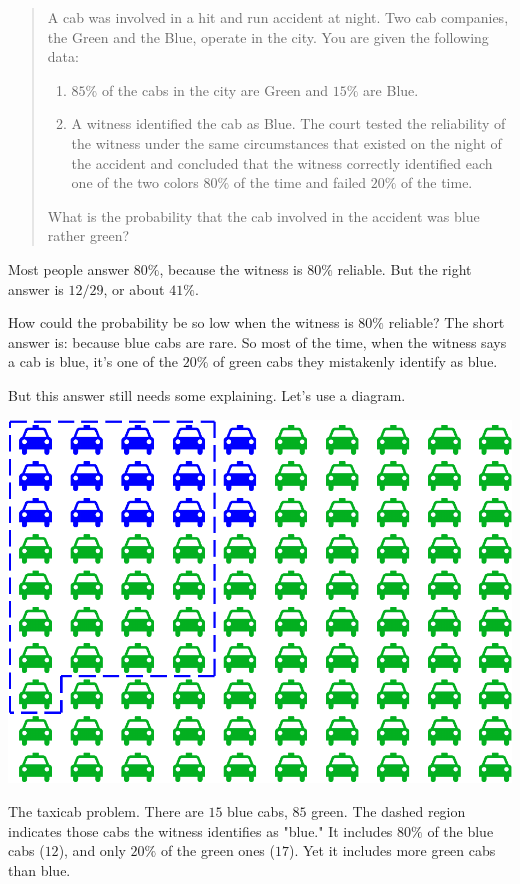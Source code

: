\documentclass[justified]{tufte-book}
\providecommand{\tightlist}{%
  \setlength{\itemsep}{0pt}\setlength{\parskip}{0pt}}
\newenvironment{problem}{\begin{quote}\normalsize}{\end{quote}}
\theoremstyle{definition}
\theoremstyle{definition}
\theoremstyle{definition}
\theoremstyle{definition}
\theoremstyle{remark}
\begin{document}
\begin{problem}
A cab was involved in a hit and run accident at night. Two cab
companies, the Green and the Blue, operate in the city. You are given
the following data:

\begin{enumerate}
\def\labelenumi{\arabic{enumi}.}
\tightlist
\item
  \(85\%\) of the cabs in the city are Green and \(15\%\) are Blue.
\item
  A witness identified the cab as Blue. The court tested the reliability
  of the witness under the same circumstances that existed on the night
  of the accident and concluded that the witness correctly identified
  each one of the two colors \(80\%\) of the time and failed \(20\%\) of
  the time.
\end{enumerate}

What is the probability that the cab involved in the accident was blue
rather green?
\end{problem}

Most people answer \(80\%\), because the witness is \(80\%\) reliable. But the right answer is \(12/29\), or about \(41\%\).

How could the probability be so low when the witness is \(80\%\) reliable? The short answer is: because blue cabs are rare. So most of the time, when the witness says a cab is blue, it's one of the \(20\%\) of green cabs they mistakenly identify as blue.

But this answer still needs some explaining. Let's use a diagram.

\begin{marginfigure}
\includegraphics{_main_files/figure-latex/taxigrid-1} \caption[The taxicab problem]{The taxicab problem. There are $15$ blue cabs, $85$ green. The dashed region indicates those cabs the witness identifies as "blue." It includes $80\%$ of the blue cabs ($12$), and only $20\%$ of the green ones ($17$). Yet it includes more green cabs than blue.}\label{fig:taxigrid}
\end{marginfigure}
\end{document}
